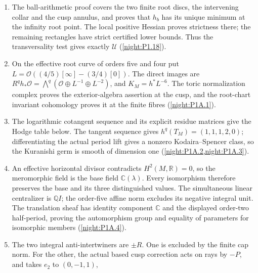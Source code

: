\RungOne
\begin{enumerate}[label=\arabic*.]
\item The ball-arithmetic proof covers the two finite root discs,
  the intervening collar and the cusp annulus, and proves that $h_b$
  has its unique minimum at the infinity root point.  The local
  positive Hessian proves strictness there; the remaining rectangles
  have strict certified lower bounds.  Thus the transversality test
  gives exactly $\mathcal U$ (\cref{night:P1.18}).
\item On the effective root curve of orders five and four put
  $L=\mathcal O((4/5)[\infty]-(3/4)[0])$.  The direct images are
  $R^qh_*\mathcal O=\bigwedge^q
  (\mathcal O\oplus L^{-1}\oplus L^{-2})$, and
  $K_M=h^*L^{-6}$.  The toric normalization complex proves the
  exterior-algebra assertion at the cusp, and the root-chart
  invariant cohomology proves it at the finite fibres
  (\cref{night:P1A.1}).
\item The logarithmic cotangent sequence and its explicit residue
  matrices give the Hodge table below.  The tangent sequence gives
  $h^q(T_M)=(1,1,1,2,0)$; differentiating the actual period lift
  gives a nonzero Kodaira--Spencer class, so the Kuranishi germ is
  smooth of dimension one (\cref{night:P1A.2,night:P1A.3}).
\item An effective horizontal divisor contradicts $H^2(M,\mathbb R)=0$,
  so the meromorphic field is the base field $\mathbb C(\lambda)$.
  Every isomorphism therefore preserves the base and its three
  distinguished values.  The simultaneous linear centralizer is
  $\mathbb Q I$; the order-five affine norm excludes its negative
  integral unit.  The translation sheaf has identity component
  $\mathbb C$ and the displayed order-two half-period, proving the
  automorphism group and equality of parameters for isomorphic
  members (\cref{night:P1A.4}).
\item The two integral anti-intertwiners are $\pm R$.  One is excluded
  by the finite cap norm.  For the other, the actual based cusp
  correction acts on rays by $-P$, and takes $e_2$ to $(0,-1,1)$,

\end{enumerate}
